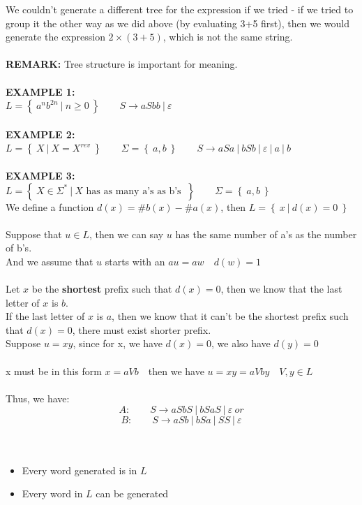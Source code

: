 \documentclass[11pt]{article}
\newcommand{\curbrak}[1]{\left\{ #1 \right\}}
\begin{document}
\newpage
We couldn't generate a different tree for the expression if we tried - if we tried to group it the other way as we did above (by evaluating 3+5
first), then we would generate the expression $2\times (3+5)$, which is not the same string.\\
\\
\textbf{REMARK: } Tree structure is important for meaning.\\
\\
\textbf{EXAMPLE 1:}\\
$L = \curbrak{\ a^n b^{2n} \ |\ n \geq 0\ } \quad \quad S\to aSbb \ |\ \varepsilon$\\
\\
\textbf{EXAMPLE 2:}\\
$L = \curbrak{\ X \ |\ X = X^{rev}\ } \quad \quad \Sigma = \curbrak{\ a, b \ }\quad\quad  S\to aSa \ |\ bSb \ |\  \varepsilon \ |\ a \ |\ b $
\\
\\
\textbf{EXAMPLE 3:}\\
$L = \curbrak{\ X\in \Sigma^* \ |\ X \text{ has as many a's as b's }\ } \quad \quad \Sigma = \curbrak{\ a, b \ }$\\
We define a function $d(x) = \#b(x) - \#a(x)$, then $L = \curbrak{\ x\ |\ d(x) = 0\ }$\\
\\
Suppose that $u \in L$, then we can say $u$ has the same number of a's as the number of b's.\\
And we assume that $u$ starts with an $a$\quad \quad $u = aw\quad d(w) = 1$\\\\
Let $x$ be the \textbf{shortest} prefix such that $d(x) = 0$, then we know that the last letter of $x$ is $b$.\\
If the last letter of $x$ is $a$, then we know that it can't be the shortest prefix such that $d(x) = 0$, there must exist shorter prefix.\\
Suppose $u = xy$, since for x, we have $d(x) = 0$, we also have $d(y) = 0$\\\\
x must be in this form $x = aVb \quad$then we have $u = xy = aVby \quad V, y \in L$\\\\
Thus, we have:
$$A: \quad\quad S \to aSbS \ |\ bSaS \ |\ \varepsilon \ or$$
$$B: \quad\quad S \to aSb \ |\ bSa \ |\ SS\ |\  \varepsilon $$
\\\\
\begin{itemize}
	\item Every word generated is in $L$
	\item Every word in $L$ can be generated
\end{itemize}
\end{document}
